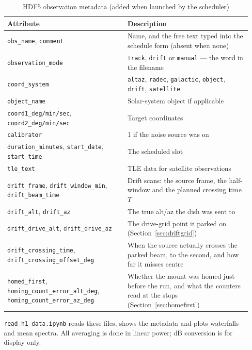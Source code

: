 \documentclass[11pt,a4paper]{article}
\begin{document}
\begin{table}[H]
\centering
\caption{HDF5 observation metadata (added when launched by the scheduler)}
\small
\begin{tabular}{lp{8.6cm}}
\toprule
\textbf{Attribute} & \textbf{Description} \\
\midrule
\texttt{obs\_name}, \texttt{comment} & Name, and the free text typed into the schedule form (absent when none) \\
\texttt{observation\_mode} & \texttt{track}, \texttt{drift} or \texttt{manual} --- the word in the filename \\
\texttt{coord\_system} & \texttt{altaz}, \texttt{radec}, \texttt{galactic}, \texttt{object}, \texttt{drift}, \texttt{satellite} \\
\texttt{object\_name} & Solar-system object if applicable \\
\texttt{coord1\_deg/min/sec}, \texttt{coord2\_deg/min/sec} & Target coordinates \\
\texttt{calibrator} & 1 if the noise source was on \\
\texttt{duration\_minutes}, \texttt{start\_date}, \texttt{start\_time} & The scheduled slot \\
\texttt{tle\_text} & TLE data for satellite observations \\
\texttt{drift\_frame}, \texttt{drift\_window\_min}, \texttt{drift\_beam\_time} & Drift scans: the source frame, the half-window and the planned crossing time $T$ \\
\texttt{drift\_alt}, \texttt{drift\_az} & The true alt/az the dish was sent to \\
\texttt{drift\_drive\_alt}, \texttt{drift\_drive\_az} & The drive-grid point it parked on (Section~\ref{sec:driftgrid}) \\
\texttt{drift\_crossing\_time}, \texttt{drift\_crossing\_offset\_deg} & When the source actually crosses the parked beam, to the second, and how far it misses centre \\
\texttt{homed\_first}, \texttt{homing\_count\_error\_alt\_deg}, \texttt{homing\_count\_error\_az\_deg} & Whether the mount was homed just before the run, and what the counters read at the stops (Section~\ref{sec:homefirst}) \\
\bottomrule
\end{tabular}
\end{table}

\texttt{read\_h1\_data.ipynb} reads these files, shows the metadata and plots waterfalls and mean spectra. All averaging is done in linear power; dB conversion is for display only.
\end{document}
